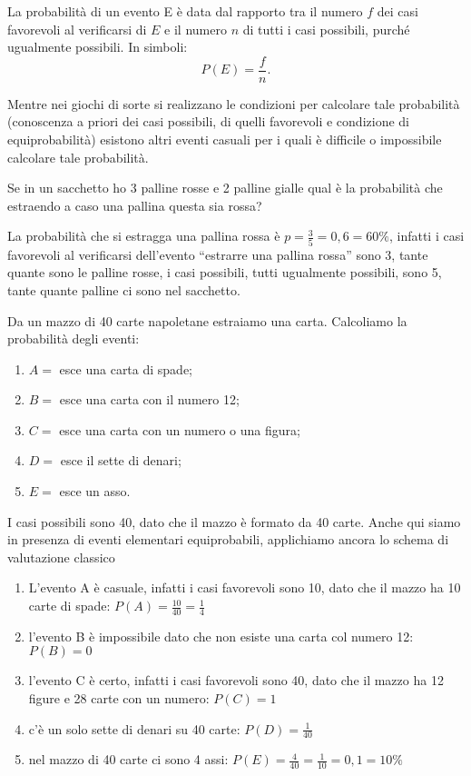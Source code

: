 La probabilità di un evento E è data dal rapporto tra il numero \(f\) dei 
casi 
favorevoli al verificarsi di \(E\) e il numero \(n\) di tutti i casi possibili, 
purché ugualmente possibili. In simboli: \[ P(E)=\dfrac f n. \]

Mentre nei giochi di sorte si realizzano le condizioni per calcolare tale 
probabilità (conoscenza a priori dei casi possibili, di quelli favorevoli e 
condizione di equiprobabilità) esistono altri eventi casuali per i quali è 
difficile o impossibile calcolare tale probabilità.

\begin{esempio}
Se in un sacchetto ho 3 palline rosse e 2 palline gialle qual è la 
probabilità 
che estraendo a caso una pallina questa sia rossa?

La probabilità che si estragga una pallina rossa è \(p=\frac 3 
5=0,6=60\text{\%}\), infatti i casi favorevoli al verificarsi dell'evento 
``estrarre una pallina rossa'' sono 3, tante quante sono le palline rosse, 
i 
casi possibili, tutti ugualmente possibili, sono 5, tante quante palline ci 
sono 
nel sacchetto.
\end{esempio}

\begin{esempio}
Da un mazzo di 40 carte napoletane estraiamo una carta. Calcoliamo la 
probabilità degli eventi:
\begin{enumerate} [noitemsep]
\item \(A=\) esce una carta di spade;
\item \(B=\) esce una carta con il numero 12;
\item \(C=\) esce una carta con un numero o una figura;
\item \(D=\) esce il sette di denari;
\item \(E=\) esce un asso.
\end{enumerate}
I casi possibili sono 40, dato che il mazzo è formato da 40 carte. Anche 
qui 
siamo in presenza di eventi elementari equiprobabili, applichiamo ancora lo 
schema di valutazione classico
\begin{enumerate} [noitemsep]
\item L'evento A è casuale, infatti i casi favorevoli sono 10, dato che il 
mazzo 
ha 10 carte di spade: \(P(A)=\frac{10}{40}=\frac 1 4\)
\item l'evento B è impossibile dato che non esiste una carta col numero 12: 
\( 
P(B)=0 \)
\item l'evento C è certo, infatti i casi favorevoli sono 40, dato che il 
mazzo ha 12 figure e 28 carte con un numero: \(P(C)=1\)
\item c'è un solo sette di denari su 40 carte: \(P(D)=\frac 1{40}\)
\item nel mazzo di 40 carte ci sono 4 assi: 
\(P(E)=\frac 4{40}=\frac 1{10}=0,1=10\%\)
\end{enumerate}
\end{esempio}

